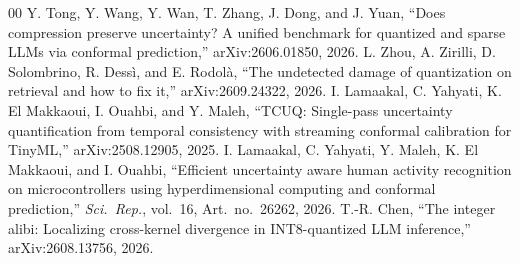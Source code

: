 \documentclass[conference]{IEEEtran}
\begin{document}
\begin{thebibliography}{00}
 Y. Tong, Y. Wang, Y. Wan, T. Zhang, J. Dong, and J. Yuan, ``Does compression preserve uncertainty? A unified benchmark for quantized and sparse LLMs via conformal prediction,'' arXiv:2606.01850, 2026.
 L. Zhou, A. Zirilli, D. Solombrino, R. Dess\`i, and E. Rodol\`a, ``The undetected damage of quantization on retrieval and how to fix it,'' arXiv:2609.24322, 2026.
 I. Lamaakal, C. Yahyati, K. El Makkaoui, I. Ouahbi, and Y. Maleh, ``TCUQ: Single-pass uncertainty quantification from temporal consistency with streaming conformal calibration for TinyML,'' arXiv:2508.12905, 2025.
 I. Lamaakal, C. Yahyati, Y. Maleh, K. El Makkaoui, and I. Ouahbi, ``Efficient uncertainty aware human activity recognition on microcontrollers using hyperdimensional computing and conformal prediction,'' \textit{Sci.\ Rep.}, vol.~16, Art.~no.~26262, 2026.
 T.-R. Chen, ``The integer alibi: Localizing cross-kernel divergence in INT8-quantized LLM inference,'' arXiv:2608.13756, 2026.
\end{thebibliography}
\end{document}
